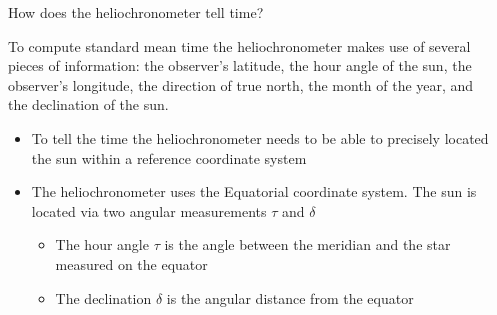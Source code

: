\documentclass[final]{beamer}
\begin{document}
\begin{frame}
\begin{columns}[t]
\begin{column}[t]{0.24 \textwidth}
\begin{center}
\end{center}


\end{column}

\begin{column}[t]{0.24 \textwidth}
\alert{How does the heliochronometer tell time?}

To compute standard mean time the heliochronometer makes use of
several pieces of information: the observer's latitude, the
hour angle of the sun, the observer's longitude, the direction of true
north, the month of the year, and the declination of the sun.


\begin{itemize}
\item To tell the time the heliochronometer needs to be able 
to precisely located the sun within a reference coordinate system

\item The heliochronometer uses the Equatorial coordinate system.
The sun is located via two angular measurements $\tau$ and $\delta$
\begin{itemize}
\item The hour angle $\tau$ is the angle between the meridian and 
the star measured on the equator
\item The declination $\delta$ is the angular distance from the equator
\end{itemize}


\end{itemize}
\end{column}
\end{columns}
\end{frame}
\end{document}
